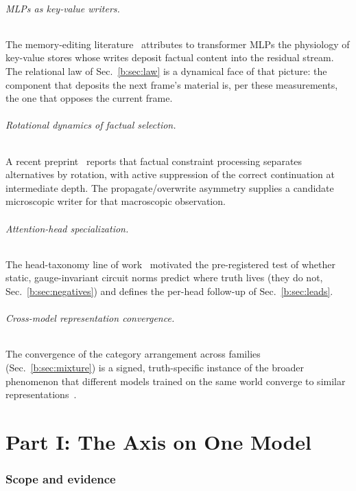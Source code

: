 \documentclass[11pt]{article}
\begin{document}
\paragraph{MLPs as key-value writers.} The memory-editing
literature~\cite{meng2022} attributes to transformer MLPs the physiology of
key-value stores whose writes deposit factual content into the residual
stream. The relational law of Sec.~\ref{b:sec:law} is a dynamical face of that
picture: the component that deposits the next frame's material is, per these
measurements, the one that opposes the current frame.

\paragraph{Rotational dynamics of factual selection.} A recent
preprint~\cite{rotational2026} reports that factual constraint processing
separates alternatives by rotation, with active suppression of the correct
continuation at intermediate depth. The propagate/overwrite asymmetry
supplies a candidate microscopic writer for that macroscopic observation.

\paragraph{Attention-head specialization.} The head-taxonomy line of
work~\cite{headgenome} motivated the pre-registered test of whether static,
gauge-invariant circuit norms predict where truth lives (they do not,
Sec.~\ref{b:sec:negatives}) and defines the per-head follow-up of
Sec.~\ref{b:sec:leads}.

\paragraph{Cross-model representation convergence.} The convergence of the
category arrangement across families (Sec.~\ref{b:sec:mixture}) is a signed,
truth-specific instance of the broader phenomenon that different models
trained on the same world converge to similar
representations~\cite{platonic2024}.


\part*{Part I: The Axis on One Model}
\section{Scope and evidence}
\label{sec:scope}
\end{document}
